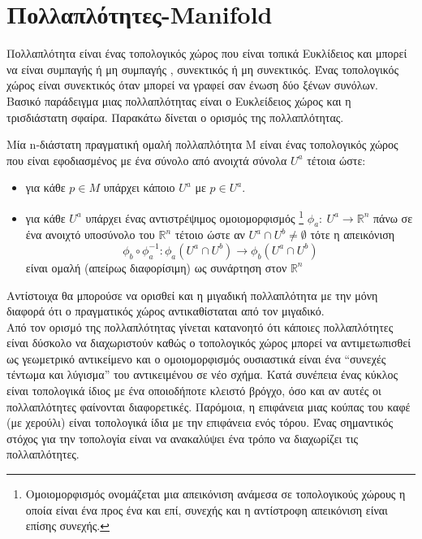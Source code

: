 \section{Πολλαπλότητες-\textlatin{Manifold}}

Πολλαπλότητα είναι ένας τοπολογικός χώρος που είναι τοπικά Ευκλίδειος και  μπορεί να είναι συμπαγής ή μη συμπαγής , συνεκτικός ή μη συνεκτικός. Ένας τοπολογικός χώρος είναι συνεκτικός όταν μπορεί να γραφεί σαν ένωση δύο ξένων συνόλων. Βασικό παράδειγμα μιας πολλαπλότητας είναι ο Ευκλείδειος χώρος και η τρισδιάστατη σφαίρα. Παρακάτω δίνεται ο ορισμός της πολλαπλότητας.
\begin{definition}
	Μία  \textlatin{n}-διάστατη πραγματική ομαλή πολλαπλότητα Μ είναι ένας τοπολογικός χώρος που είναι εφοδιασμένος με ένα σύνολο από ανοιχτά σύνολα $U^a$ τέτοια ώστε: 
	\begin{itemize}
		\item για κάθε $p \in M $ υπάρχει κάποιο $U^a$ με $p \in U^a$.
		\item για κάθε $U^a$ υπάρχει ένας αντιστρέψιμος ομοιομορφισμός \footnote{Ομοιομορφισμός ονομάζεται μια απεικόνιση ανάμεσα σε τοπολογικούς χώρους η οποία είναι ένα προς ένα και επί, συνεχής και η αντίστροφη απεικόνιση είναι επίσης συνεχής.} $\phi_a: ~ U^a \rightarrow \mathbb{R}^n $ πάνω σε ένα ανοιχτό υποσύνολο του $\mathbb{R}^n$ τέτοιο ώστε αν $U^a \cap U^b \neq \emptyset $  τότε η απεικόνιση 
			\[ \phi_b \circ \phi_a ^{-1} :\phi_a (U^a \cap U^b) \rightarrow \phi_b(U^a \cap U^b)\]
		είναι ομαλή (απείρως διαφορίσιμη) ως συνάρτηση στον $\mathbb{R}^n$
	 \end{itemize}
\end{definition}
Αντίστοιχα θα μπορούσε να ορισθεί και η μιγαδική πολλαπλότητα με την μόνη διαφορά ότι ο πραγματικός χώρος αντικαθίσταται από τον μιγαδικό.\\
Από τον ορισμό της πολλαπλότητας γίνεται κατανοητό ότι κάποιες πολλαπλότητες είναι δύσκολο να διαχωριστούν καθώς ο τοπολογικός χώρος μπορεί να αντιμετωπισθεί ως γεωμετρικό  αντικείμενο και ο ομοιομορφισμός  ουσιαστικά είναι ένα “συνεχές τέντωμα και λύγισμα” του αντικειμένου σε νέο σχήμα. Κατά συνέπεια ένας κύκλος είναι τοπολογικά ίδιος με ένα οποιοδήποτε κλειστό βρόγχο, όσο και αν αυτές οι πολλαπλότητες φαίνονται διαφορετικές. Παρόμοια, η επιφάνεια μιας κούπας του καφέ (με χερούλι)  είναι τοπολογικά ίδια με την επιφάνεια ενός  τόρου. Ένας σημαντικός στόχος για την τοπολογία  είναι να ανακαλύψει ένα τρόπο να διαχωρίζει τις πολλαπλότητες. \\


